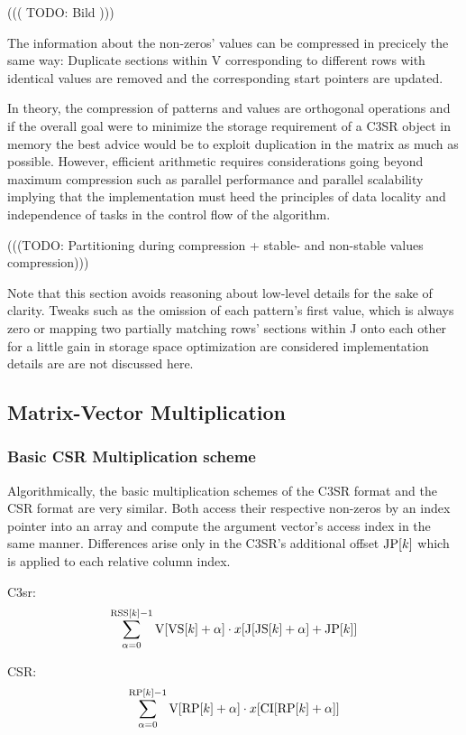 \documentclass{article}
\begin{document}
      ((( TODO: Bild )))

    The information about the non-zeros' values can be compressed in precicely the same way: Duplicate sections within V
    corresponding to different rows with identical values are removed and the corresponding start pointers are updated.

    In theory, the compression of patterns and values are orthogonal operations and if the overall goal were to minimize
    the storage requirement of a C3SR object in memory the best advice would be to exploit duplication in the matrix as
    much as possible. However, efficient arithmetic requires considerations going beyond maximum compression such as
    parallel performance and parallel scalability implying that the implementation must heed the principles of
    data locality and independence of tasks in the control flow of the algorithm.

    (((TODO: Partitioning during compression + stable- and non-stable values compression)))

    Note that this section avoids reasoning about low-level details for the sake of clarity. Tweaks such as the omission
    of each pattern's first value, which is always zero or mapping two partially matching rows' sections within J onto
    each other for a little gain in storage space optimization are considered implementation details are are not discussed
    here.

  \subsection{Matrix-Vector Multiplication}

    \subsubsection{Basic CSR Multiplication scheme}

      Algorithmically, the basic multiplication schemes of the C3SR format and the CSR format are very similar. Both access their respective non-zeros by an index pointer into an array and compute the argument vector's access index in the same manner. Differences arise only in the C3SR's additional offset $\JP[k]$ which is applied to each relative column index.

      C3sr:
      $$\sum \limits_{\alpha = 0}^{\RSS[k] - 1} \V[\VS[k] + \alpha] \cdot x[\J[\JS[k] + \alpha] + \JP[k]]$$

      CSR:
      $$\sum \limits_{\alpha = 0}^{\RP[k] - 1} \V[\RP[k] + \alpha] \cdot x[\CI[\RP[k] + \alpha]]$$
\end{document}
